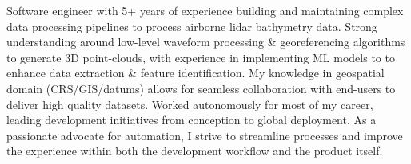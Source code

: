 \begin{justify}
Software engineer with 5+ years of experience building and maintaining complex data processing pipelines to process airborne lidar bathymetry data. Strong understanding around low-level waveform processing \& georeferencing algorithms to generate 3D point-clouds, with experience in implementing ML models to to enhance data extraction \& feature identification. My knowledge in geospatial domain (CRS/GIS/datums) allows for seamless collaboration with end-users to deliver high quality datasets. Worked autonomously for most of my career, leading development initiatives from conception to global deployment. As a passionate advocate for automation, I strive to streamline processes and improve the experience within both the development workflow and the product itself.
\end{justify}